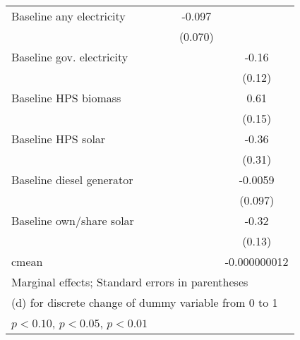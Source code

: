 \begin{table}[htbp]
\begin{tabular*}{1\hsize}{@{\hskip\tabcolsep\extracolsep\fill}l*{5}{c}}
Baseline any electricity&                  &                  &                  &   -0.097         &                  \\
                &                  &                  &                  &  (0.070)         &                  \\
Baseline gov. electricity&                  &                  &                  &                  &    -0.16         \\
                &                  &                  &                  &                  &   (0.12)         \\
Baseline HPS biomass&                  &                  &                  &                  &     0.61\sym{***}\\
                &                  &                  &                  &                  &   (0.15)         \\
Baseline HPS solar&                  &                  &                  &                  &    -0.36         \\
                &                  &                  &                  &                  &   (0.31)         \\
Baseline diesel generator&                  &                  &                  &                  &  -0.0059         \\
                &                  &                  &                  &                  &  (0.097)         \\
Baseline own/share solar&                  &                  &                  &                  &    -0.32\sym{**} \\
                &                  &                  &                  &                  &   (0.13)         \\
\midrule
cmean           &                  &                  &                  &                  &-0.000000012         \\
\bottomrule
\multicolumn{6}{l}{\footnotesize Marginal effects; Standard errors in parentheses}\\
\multicolumn{6}{l}{\footnotesize  (d) for discrete change of dummy variable from 0 to 1}\\
\multicolumn{6}{l}{\footnotesize \sym{*} \(p<0.10\), \sym{**} \(p<0.05\), \sym{***} \(p<0.01\)}\\
\end{tabular*}
\end{table}
